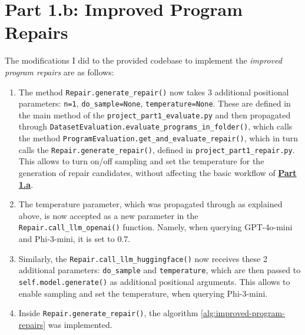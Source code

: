 \documentclass{article}
\begin{document}
\clearpage 

\section{Part 1.b: Improved Program Repairs}\label{part-b}


The modifications I did to the provided codebase to implement the \textit{improved program repairs} are as follows:

\begin{enumerate}
    \item The method \texttt{Repair.generate\_repair()} now takes 3 additional positional parameters: \texttt{n=1}, \texttt{do\_sample=None}, \texttt{temperature=None}. These are defined in the main method of the \texttt{project\_part1\_evaluate.py} and then propagated through \texttt{DatasetEvaluation.evaluate\_programs\_in\_folder()}, which calls the method \texttt{ProgramEvaluation.get\_and\_evaluate\_repair()}, which in turn calls the \texttt{Repair.generate\_repair()}, defined in \texttt{project\_part1\_repair.py}. This allows to turn on/off sampling and set the temperature for the generation of repair candidates, without affecting the basic workflow of \hyperref[part-a]{\textbf{Part 1.a}}.
    \item The temperature parameter, which was propagated through as explained above, is now accepted as a new parameter in the \texttt{Repair.call\_llm\_openai()} function. Namely, when querying GPT-4o-mini and Phi-3-mini, it is set to $0.7$. 
    \item Similarly, the \texttt{Repair.call\_llm\_huggingface()} now receives these 2 additional parameters: \texttt{do\_sample} and \texttt{temperature}, which are then passed to \texttt{self.model.generate()} as additional positional arguments. This allows to enable sampling and set the temperature, when querying Phi-3-mini.
    \item Inside \texttt{Repair.generate\_repair()}, the algorithm \ref{alg:improved-program-repairs} was implemented. 
\end{enumerate}
\end{document}
